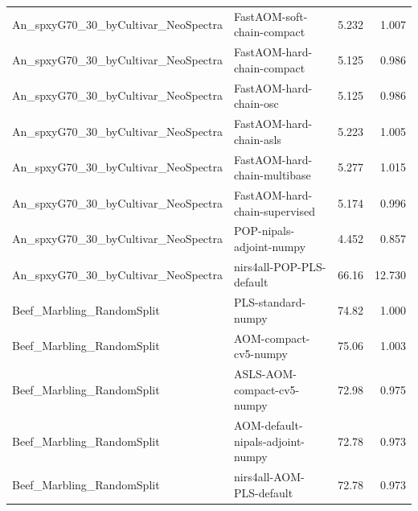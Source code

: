 \begin{landscape}
\begin{longtable}{L{8.0cm}L{9.5cm}rr}
An\_\allowbreak{}spxyG70\_\allowbreak{}30\_\allowbreak{}byCultivar\_\allowbreak{}NeoSpectra & FastAOM-\allowbreak{}soft-\allowbreak{}chain-\allowbreak{}compact & 5.232 & 1.007 \\
An\_\allowbreak{}spxyG70\_\allowbreak{}30\_\allowbreak{}byCultivar\_\allowbreak{}NeoSpectra & FastAOM-\allowbreak{}hard-\allowbreak{}chain-\allowbreak{}compact & 5.125 & 0.986 \\
An\_\allowbreak{}spxyG70\_\allowbreak{}30\_\allowbreak{}byCultivar\_\allowbreak{}NeoSpectra & FastAOM-\allowbreak{}hard-\allowbreak{}chain-\allowbreak{}osc & 5.125 & 0.986 \\
An\_\allowbreak{}spxyG70\_\allowbreak{}30\_\allowbreak{}byCultivar\_\allowbreak{}NeoSpectra & FastAOM-\allowbreak{}hard-\allowbreak{}chain-\allowbreak{}asls & 5.223 & 1.005 \\
An\_\allowbreak{}spxyG70\_\allowbreak{}30\_\allowbreak{}byCultivar\_\allowbreak{}NeoSpectra & FastAOM-\allowbreak{}hard-\allowbreak{}chain-\allowbreak{}multibase & 5.277 & 1.015 \\
An\_\allowbreak{}spxyG70\_\allowbreak{}30\_\allowbreak{}byCultivar\_\allowbreak{}NeoSpectra & FastAOM-\allowbreak{}hard-\allowbreak{}chain-\allowbreak{}supervised & 5.174 & 0.996 \\
An\_\allowbreak{}spxyG70\_\allowbreak{}30\_\allowbreak{}byCultivar\_\allowbreak{}NeoSpectra & POP-\allowbreak{}nipals-\allowbreak{}adjoint-\allowbreak{}numpy & 4.452 & 0.857 \\
An\_\allowbreak{}spxyG70\_\allowbreak{}30\_\allowbreak{}byCultivar\_\allowbreak{}NeoSpectra & nirs4all-\allowbreak{}POP-\allowbreak{}PLS-\allowbreak{}default & 66.16 & 12.730 \\
Beef\_\allowbreak{}Marbling\_\allowbreak{}RandomSplit & PLS-\allowbreak{}standard-\allowbreak{}numpy & 74.82 & 1.000 \\
Beef\_\allowbreak{}Marbling\_\allowbreak{}RandomSplit & AOM-\allowbreak{}compact-\allowbreak{}cv5-\allowbreak{}numpy & 75.06 & 1.003 \\
Beef\_\allowbreak{}Marbling\_\allowbreak{}RandomSplit & ASLS-\allowbreak{}AOM-\allowbreak{}compact-\allowbreak{}cv5-\allowbreak{}numpy & 72.98 & 0.975 \\
Beef\_\allowbreak{}Marbling\_\allowbreak{}RandomSplit & AOM-\allowbreak{}default-\allowbreak{}nipals-\allowbreak{}adjoint-\allowbreak{}numpy & 72.78 & 0.973 \\
Beef\_\allowbreak{}Marbling\_\allowbreak{}RandomSplit & nirs4all-\allowbreak{}AOM-\allowbreak{}PLS-\allowbreak{}default & 72.78 & 0.973 \\

\end{longtable}
\end{landscape}
